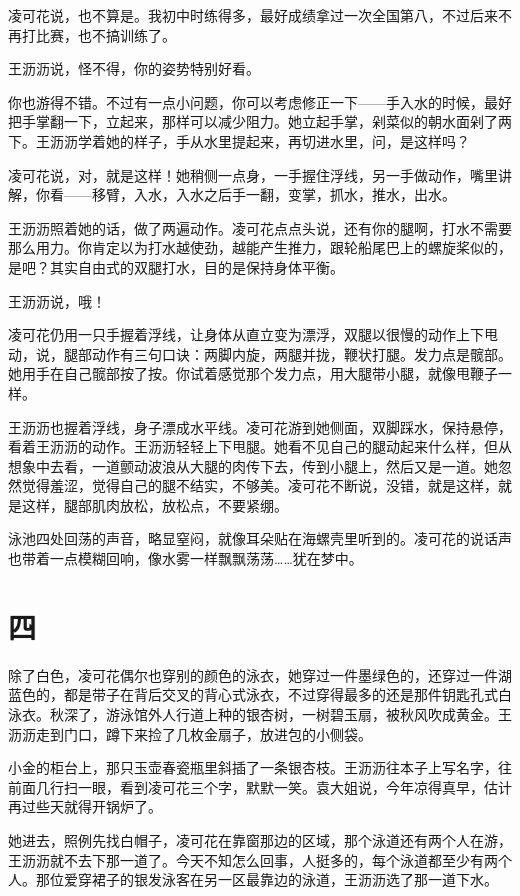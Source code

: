 \documentclass[lang=cn,newtx,12pt,scheme=chinese]{elegantbook}
\begin{document}
凌可花说，也不算是。我初中时练得多，最好成绩拿过一次全国第八，不过后来不再打比赛，也不搞训练了。

王沥沥说，怪不得，你的姿势特别好看。

你也游得不错。不过有一点小问题，你可以考虑修正一下——手入水的时候，最好把手掌翻一下，立起来，那样可以减少阻力。她立起手掌，剁菜似的朝水面剁了两下。王沥沥学着她的样子，手从水里提起来，再切进水里，问，是这样吗？

凌可花说，对，就是这样！她稍侧一点身，一手握住浮线，另一手做动作，嘴里讲解，你看——移臂，入水，入水之后手一翻，变掌，抓水，推水，出水。

王沥沥照着她的话，做了两遍动作。凌可花点点头说，还有你的腿啊，打水不需要那么用力。你肯定以为打水越使劲，越能产生推力，跟轮船尾巴上的螺旋桨似的，是吧？其实自由式的双腿打水，目的是保持身体平衡。

王沥沥说，哦！

凌可花仍用一只手握着浮线，让身体从直立变为漂浮，双腿以很慢的动作上下甩动，说，腿部动作有三句口诀：两脚内旋，两腿并拢，鞭状打腿。发力点是髋部。她用手在自己髋部按了按。你试着感觉那个发力点，用大腿带小腿，就像甩鞭子一样。

王沥沥也握着浮线，身子漂成水平线。凌可花游到她侧面，双脚踩水，保持悬停，看着王沥沥的动作。王沥沥轻轻上下甩腿。她看不见自己的腿动起来什么样，但从想象中去看，一道颤动波浪从大腿的肉传下去，传到小腿上，然后又是一道。她忽然觉得羞涩，觉得自己的腿不结实，不够美。凌可花不断说，没错，就是这样，就是这样，腿部肌肉放松，放松点，不要紧绷。

泳池四处回荡的声音，略显窒闷，就像耳朵贴在海螺壳里听到的。凌可花的说话声也带着一点模糊回响，像水雾一样飘飘荡荡……犹在梦中。
\section{四}
除了白色，凌可花偶尔也穿别的颜色的泳衣，她穿过一件墨绿色的，还穿过一件湖蓝色的，都是带子在背后交叉的背心式泳衣，不过穿得最多的还是那件钥匙孔式白泳衣。秋深了，游泳馆外人行道上种的银杏树，一树碧玉扇，被秋风吹成黄金。王沥沥走到门口，蹲下来捡了几枚金扇子，放进包的小侧袋。

小金的柜台上，那只玉壶春瓷瓶里斜插了一条银杏枝。王沥沥往本子上写名字，往前面几行扫一眼，看到凌可花三个字，默默一笑。袁大姐说，今年凉得真早，估计再过些天就得开锅炉了。

她进去，照例先找白帽子，凌可花在靠窗那边的区域，那个泳道还有两个人在游，王沥沥就不去下那一道了。今天不知怎么回事，人挺多的，每个泳道都至少有两个人。那位爱穿裙子的银发泳客在另一区最靠边的泳道，王沥沥选了那一道下水。
\end{document}
